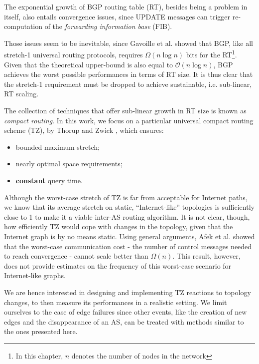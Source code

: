 \documentclass[a4paper,11pt,oneside]{report}
\begin{document}
The exponential growth of BGP routing table (RT), besides being a problem in itself, also entails convergence issues, since UPDATE messages can trigger re-computation of the \emph{forwarding information base} (FIB).

\bigskip
Those issues seem to be inevitable, since Gavoille et al. \cite{gavoilleMemoryRequirementRouting1996} showed that BGP, like all stretch-1 universal routing protocols, requires $\Omega(n\log n)$ bits for the RT\footnote{In this chapter, $n$ denotes the number of nodes in the network}. Given that the theoretical upper-bound is also equal to $\mathcal{O}(n\log n)$, BGP achieves the worst possible performances in terms of RT size. It is thus clear that the stretch-1 requirement must be dropped to achieve sustainable, i.e. sub-linear, RT scaling.

The collection of techniques that offer sub-linear growth in RT size is known as \emph{compact routing}.
In this work, we focus on a particular universal compact routing scheme (TZ), by Thorup and Zwick \cite{thorupApproximateDistanceOracles2005}, which ensures:
\begin{itemize}
\item bounded maximum stretch;
\item nearly optimal space requirements;
\item \textbf{constant} query time.
\end{itemize}

Although the worst-case stretch of TZ is far from acceptable for Internet paths, we know \cite{krioukovCompactRoutingInternet2007} that its average stretch on static, ``Internet-like'' topologies is sufficiently close to 1 to make it a viable inter-AS routing algorithm. It is not clear, though, how efficiently TZ would cope with changes in the topology, given that the Internet graph is by no means static. Using general arguments, Afek et al. \cite{afekUpperLowerBounds1989} showed that the worst-case communication cost - the number of control messages needed to reach convergence - cannot scale better than $\Omega(n)$.
This result, however, does not provide estimates on the frequency of this worst-case scenario for Internet-like graphs.

\bigskip
We are hence interested in designing and implementing TZ reactions to topology changes, to then measure its performances in a realistic setting. We limit ourselves to the case of edge failures since other events, like the creation of new edges and the disappearance of an AS, can be treated with methods similar to the ones presented here.
\end{document}
